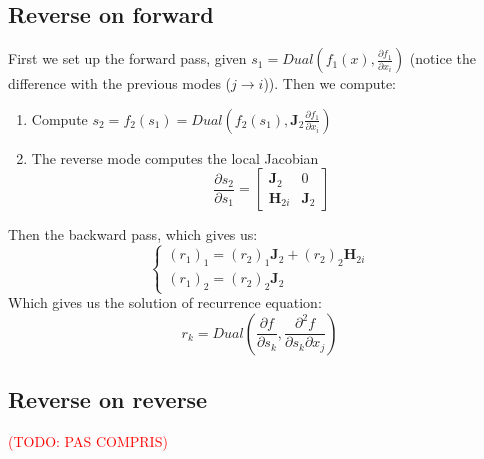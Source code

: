 \documentclass[12pt, openany]{report}
\newcommand{\J}{\mathbf{J}}
\newcommand{\He}{\mathbf{H}}
\theoremstyle{definition}
\begin{document}
\subsection{Reverse on forward}
First we set up the forward pass, given $s_1 = Dual(f_1(x), \frac{\partial f_1}{\partial x_i })$ (notice the difference with the previous modes ($j \to i$)). Then we compute:
\begin{enumerate}
  \item Compute $s_2 = f_2(s_1) = Dual(f_2(s_1), \J_2 \frac{\partial f_1}{\partial x_i})$
  \item The reverse mode computes the local Jacobian \begin{equation}
    \frac{\partial s_2}{\partial s_1} = \begin{bmatrix}
      \J_2 & 0\\
      \He_{2i} & \J_2
    \end{bmatrix} %
  \end{equation} 
\end{enumerate}
Then the backward pass, which gives us:
\begin{equation}
  \begin{cases}
    (r_1)_1 = (r_2)_1 \J_2 + (r_2)_2 \He_{2i}\\
    (r_1)_2 = (r_2)_2 \J_2
  \end{cases}
\end{equation}
Which gives us the solution of recurrence equation:
\begin{equation}
  r_k = Dual(\frac{\partial f}{\partial s_k}, \frac{\partial^2 f}{\partial s_k \partial x_j})
\end{equation}
\subsection{Reverse on reverse}
\textcolor{red}{(TODO: PAS COMPRIS)}
\end{document}
